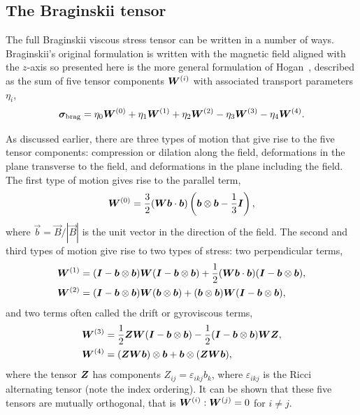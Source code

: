 \subsection{The Braginskii tensor}

\label{sec:braginskii_tensor}

The full Braginskii viscous stress tensor can be written in a number of ways. Braginskii's original formulation is written with the magnetic field aligned with the $z$-axis so presented here is the more general formulation of Hogan~\cite{hoganCollisionalTransportMomentum1984}, described as the sum of five tensor components ${\bm W}^{(i)}$ with associated transport parameters $\eta_i$,
\begin{equation}
\label{eq:braginskii_tensor}
{\bm \sigma}_{\text{brag}} = \eta_0 {\bm W}^{(0)} + \eta_1 {\bm W}^{(1)} + \eta_2 {\bm W}^{(2)} - \eta_3 {\bm W}^{(3)} - \eta_4 {\bm W}^{(4)}.
\end{equation}

As discussed earlier, there are three types of motion that give rise to the five tensor components: compression or dilation along the field, deformations in the plane transverse to the field, and deformations in the plane including the field. The first type of motion gives rise to the parallel term,
\begin{equation}
  \label{eq:braginskii_parallel_term}
  {\bm W}^{(0)} = \frac{3}{2}({\bm W}{\bm b}\cdot{\bm b}) \left( {\bm b} \otimes {\bm b} - \frac{1}{3}{\bm I} \right),
\end{equation}
where $\vec{b} = \vec{B}/|\vec{B}|$ is the unit vector in the direction of the field. The second and third types of motion give rise to two types of stress: two perpendicular terms,
\begin{align}
{\bm W}^{(1)} &= ({\bm I} - {\bm b} \otimes {\bm b}){\bm W}({\bm I} - {\bm b} \otimes {\bm b}) + \frac{1}{2}({\bm W}{\bm b} \cdot {\bm b})({\bm I} - {\bm b} \otimes {\bm b}), \\
{\bm W}^{(2)} &= ({\bm I} - {\bm b} \otimes {\bm b}){\bm W}({\bm b} \otimes {\bm b}) + ({\bm b} \otimes {\bm b}){\bm W}({\bm I} - {\bm b} \otimes {\bm b}),
\end{align}
and two terms often called the drift or gyroviscous terms,
\begin{align}
{\bm W}^{(3)} &= \frac{1}{2} {\bm Z}{\bm W}({\bm I} - {\bm b} \otimes {\bm b}) - \frac{1}{2}({\bm I} - {\bm b} \otimes {\bm b}){\bm W}{\bm Z}, \\
{\bm W}^{(4)} &= ({\bm Z}{\bm W}{\bm b}) \otimes {\bm b} + {\bm b} \otimes ({\bm Z} {\bm W} {\bm b}),
\label{eq:drift_terms}
\end{align}
where the tensor ${\bm Z}$ has components $Z_{ij} = \varepsilon_{ikj}b_k$, where $\varepsilon_{ikj}$ is the Ricci alternating tensor (note the index ordering). It can be shown that these five tensors are mutually orthogonal, that is ${\bm W}^{(i)}:{\bm W}^{(j)} = 0$ for $i\ne j$.

